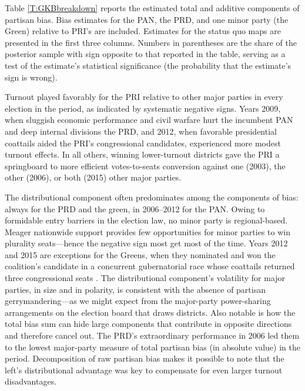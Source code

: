 \documentclass[letter,12pt]{article}
\begin{document}
{Table \ref{T:GKBbreakdown} reports the estimated total and additive components of partisan bias. Bias estimates for the PAN, the PRD, and one minor party (the Green) relative to PRI's are included. Estimates for the status quo maps are presented in the first three columns. Numbers in parentheses are the share of the posterior sample with sign opposite to that reported in the table, serving as a test of the estimate's statistical significance (the probability that the estimate's sign is wrong). 

Turnout played favorably for the PRI relative to other major parties in every election in the period, as indicated by systematic negative signs. Years 2009, when sluggish economic performance and civil warfare hurt the incumbent PAN and deep internal divisions the PRD, and 2012, when favorable presidential coattails aided the PRI's congressional candidates, experienced more modest turnout effects. In all others, winning lower-turnout districts gave the PRI a springboard to more efficient votes-to-seats conversion against one (2003), the other (2006), or both (2015) other major parties. 

The distributional component often predominates among the components of bias: always for the PRD and the green, in 2006--2012 for the PAN. Owing to formidable entry barriers in the election law, no minor party is regional-based. Meager nationwide support provides few opportunities for minor parties to win plurality seats---hence the negative sign most get most of the time. Years 2012 and 2015 are exceptions for the Greens, when they nominated and won the coalition's candidate in a concurrent gubernatorial race whose coattails returned three congressional seats \citep{magar.gubCoatMx.2012}. The distributional component's volatility for major parties, in size and in polarity, is consistent with the absence of partisan gerrymandering---as we might expect from the major-party power-sharing arrangements on the election board that draws districts. Also notable is how the total bias sum can hide large components that contribute in opposite directions and therefore cancel out. The PRD's extraordinary performance in 2006 led them to the lowest major-party measure of total partisan bias (in absolute value) in the period. Decomposition of raw partisan bias makes it possible to note that the left's distributional advantage was key to compensate for even larger turnout disadvantages. 

}
\end{document}
